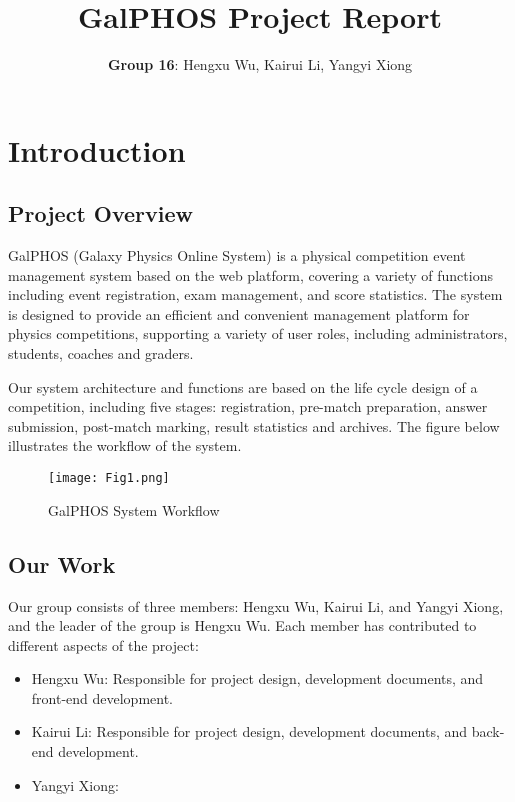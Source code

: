 \documentclass[12pt]{article}
\title{GalPHOS Project Report}
\author{\textbf{Group 16}: Hengxu Wu, Kairui Li, Yangyi Xiong}
\date{}
\begin{document}
\maketitle

\section{Introduction}
\subsection{Project Overview}

GalPHOS (Galaxy Physics Online System) is a physical competition event management system based on the web platform, covering a variety of functions including event registration, exam management, and score statistics. The system is designed to provide an efficient and convenient management platform for physics competitions, supporting a variety of user roles, including administrators, students, coaches and graders.

Our system architecture and functions are based on the life cycle design of a competition, including five stages: registration, pre-match preparation, answer submission, post-match marking, result statistics and archives. The figure below illustrates the workflow of the system.
\begin{figure}[H]
    \centering
    \texttt{[image: Fig1.png]}
    \caption{GalPHOS System Workflow}
    \label{fig:workflow}
\end{figure}

\subsection{Our Work}

Our group consists of three members: Hengxu Wu, Kairui Li, and Yangyi Xiong, and the leader of the group is Hengxu Wu. Each member has contributed to different aspects of the project:
\begin{itemize}
    \item Hengxu Wu: Responsible for project design, development documents, and front-end development.
    \item Kairui Li: Responsible for project design, development documents, and back-end development.
    \item Yangyi Xiong: %
\end{itemize}
\end{document}
